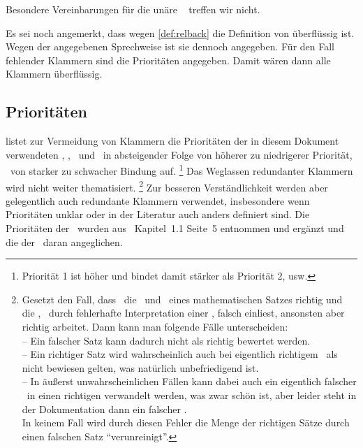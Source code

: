Besondere Vereinbarungen für die unäre \Operation\ \chrqt{$\opubsp$} treffen wir nicht.

Es sei noch angemerkt, dass wegen \eqref{def:relback} die Definition von \chrqt{$\metarep$}  überflüssig ist.
Wegen der angegebenen Sprechweise ist sie dennoch angegeben.
Für den Fall fehlender Klammern sind die Prioritäten  angegeben.
Damit wären dann alle Klammern  überflüssig.

\subsection{Prioritäten}%
\label{sub:Prioritäten}

 listet zur Vermeidung von Klammern die Prioritäten der in diesem Dokument verwendeten \Operationen, \Relationen, \Junktoren\ und \Definitionen\ in absteigender Folge von höherer zu niedrigerer Priorität, \textdh\ von starker zu schwacher Bindung auf.%
\footnote{Priorität 1 ist höher und bindet damit stärker als Priorität 2, usw.}
Das Weglassen redundanter Klammern wird  nicht weiter thematisiert.%
\footnote{%
	Gesetzt den Fall, dass \ASBA\ die \Voraussetzungen\ und \Folgerungen\ eines mathematischen Satzes richtig und die \Beweisschritte, \textzB\ durch fehlerhafte Interpretation einer \Formel, falsch einliest, ansonsten aber richtig arbeitet.
	Dann kann man folgende Fälle unterscheiden:\\
	-- Ein falscher Satz kann dadurch nicht als richtig bewertet werden.\\
	-- Ein richtiger Satz wird wahrscheinlich auch bei eigentlich richtigem \Beweis\ als nicht bewiesen gelten, was natürlich unbefriedigend ist.\\
	-- In äußerst unwahrscheinlichen Fällen kann dabei auch ein eigentlich falscher \Beweis\ in einen richtigen verwandelt werden, was zwar schön ist, aber leider steht in der Dokumentation dann ein falscher \Beweis.\\
	In keinem Fall wird durch diesen Fehler die Menge der richtigen Sätze durch einen falschen Satz \enquote{verunreinigt}.
}
Zur besseren Verständlichkeit werden aber gelegentlich auch redundante Klammern verwendet, insbesondere wenn Prioritäten unklar oder in der Literatur auch anders definiert sind.
Die Prioritäten der \Junktoren\ wurden aus~\cite{bib:Rautenberg} Kapitel~1.1 Seite~5 entnommen und ergänzt und die der \Metaoperationen\ daran angeglichen.

